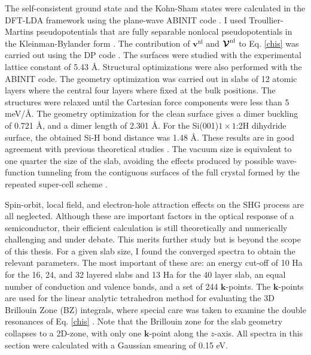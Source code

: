 \documentclass[11pt]{book}
\begin{document}
The self-consistent ground state and the Kohn-Sham states were calculated in the
DFT-LDA framework using the plane-wave ABINIT code \cite{gonzeCPS09, abinit}. I
used Troullier-Martins pseudopotentials \cite{troullierPRB91} that are fully
separable nonlocal pseudopotentials in the Kleinman-Bylander
form \cite{kleinmanPRL82}. The contribution of $\mathbf{v}^\mathrm{nl}$ and
$\boldsymbol{\mathcal{\cal V}}^\mathrm{nl}$ to Eq. \eqref{chis} was carried out
using the DP code \cite{olevanoDP}. The surfaces were studied with the
experimental lattice constant of 5.43 \AA. Structural optimizations were also
performed with the ABINIT code. The geometry optimization was carried out in
slabs of 12 atomic layers where the central four layers where fixed at the bulk
positions. The structures were relaxed until the Cartesian force components were
less than 5 meV/\AA. The geometry optimization for the clean surface gives a
dimer buckling of 0.721 \AA, and a dimer length of 2.301 \AA. For the
Si(001)$1\times 1$:2H dihydride surface, the obtained Si-H bond distance was
1.48 \AA. These results are in good agreement with previous theoretical
studies \cite{caramellaPRB09,mendozaPRB06}. The vacuum size is equivalent to one
quarter the size of the slab, avoiding the effects produced by possible
wave-function tunneling from the contiguous surfaces of the full crystal formed
by the repeated super-cell scheme \cite{mendozaPRB06}.

Spin-orbit, local field, and electron-hole attraction \cite{beyond} effects on
the SHG process are all neglected. Although these are important factors in the
optical response of a semiconductor, their efficient calculation is still
theoretically and numerically challenging and under debate. This merits further
study but is beyond the scope of this thesis. For a given slab size, I found the
converged spectra to obtain the relevant parameters. The most important of these
are: an energy cut-off of 10 Ha for the 16, 24, and 32 layered slabs and 13 Ha
for the 40 layer slab, an equal number of conduction and valence bands, and a
set of 244 $\mathbf{k}$-points. The $\mathbf{k}$-points are used for the linear
analytic tetrahedron method for evaluating the 3D Brillouin Zone (BZ) integrals,
where special care was taken to examine the double resonances of Eq.
\eqref{chis} \cite{nastosPRB05}. Note that the Brillouin zone for the slab
geometry collapses to a 2D-zone, with only one $\mathbf{k}$-point along the
$z$-axis. All spectra in this section were calculated with a Gaussian smearing
of 0.15 eV.
\end{document}
